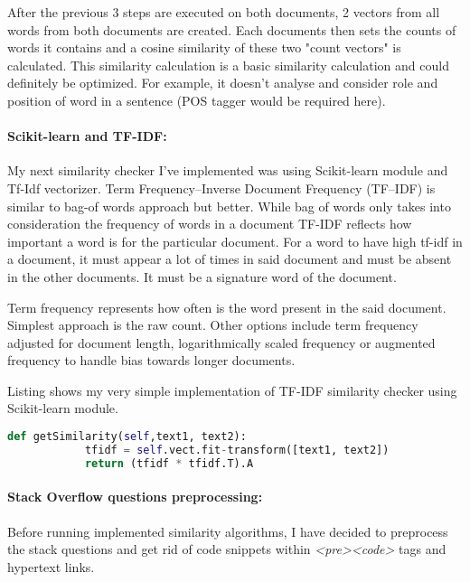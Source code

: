 After the previous 3 steps are executed on both documents, 2 vectors from all words from both documents are created. Each documents then sets the counts of words it contains and a cosine similarity of these two "count vectors" is calculated. This similarity calculation is a basic similarity calculation and could definitely be optimized. For example, it doesn't analyse and consider role and position of word in a sentence (POS tagger would be required here). 

\paragraph{Scikit-learn and TF-IDF:}My next similarity checker I've implemented was using Scikit-learn module and Tf-Idf vectorizer. Term Frequency–Inverse Document Frequency (TF–IDF) is similar to bag-of words approach but better. While bag of words only takes into consideration the frequency of words in a document TF-IDF reflects how important a word is for the particular document. For a word to have high tf-idf in a document, it must appear a lot of times in said document and must be absent in the other documents. It must be a signature word of the document.

Term frequency represents how often is the word present in the said document. Simplest approach is the raw count. Other options include term frequency adjusted for document length, logarithmically scaled frequency or augmented frequency to handle bias towards longer documents.

Listing shows my very simple implementation of TF-IDF similarity checker using Scikit-learn module.

\begin{lstlisting}[caption={Text similarity implementation with Scikit using Tf-Idf model},label={lst:nltkTextSimilarity},language=Python]
		def getSimilarity(self,text1, text2):
			tfidf = self.vect.fit-transform([text1, text2])
			return (tfidf * tfidf.T).A
\end{lstlisting}

\paragraph{Stack Overflow questions preprocessing:} Before running implemented similarity algorithms, I have decided to preprocess the stack questions and get rid of code snippets within \textit{\textless pre\textgreater\textless code\textgreater} tags and hypertext links.

	